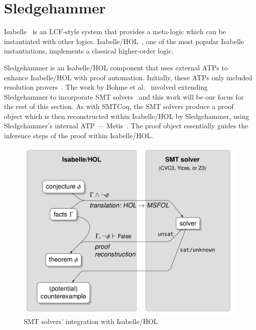 \documentclass[11pt]{article}
\begin{document}
	
	\section{Sledgehammer}
	\label{sec:hammer}
	Isabelle~\cite{DBLP:journals/corr/cs-LO-9301106} 
	is an LCF-style system that 
	provides a meta-logic which can be 
	instantiated with other logics.
	Isabelle/HOL~\cite{10.5555/1791547}, 
	one of the most popular Isabelle 
	instantiations, implements a 
	classical higher-order logic. 
	
	Sledgehammer is
	an Isabelle/HOL component that 
	uses external ATPs to enhance 
	Isabelle/HOL with proof 
	automation. Initially, these 
	ATPs only included resolution 
	provers~\cite{10.1007/978-3-642-39799-8_1}.
	The work by Bohme et 
	al.~\cite{bohme} involved 
	extending Sledgehammer to 
	incorporate SMT
	solvers~\cite{Barrett2018} and this 
	work will be our focus for the 
	rest of this section. As with 
	SMTCoq, the SMT solvers produce a 
	proof object which is 
	then reconstructed within
	Isabelle/HOL by Sledgehammer, 
	using Sledgehammer's internal 
	ATP --- Metis~\cite{hurd2003d}. The 
	proof object essentially guides 
	the inference steps of the proof 
	within Isabelle/HOL.
	
	\begin{figure}[t]
		\begin{center}
			\includegraphics[scale=0.3]{sledgehammer}
			\caption{SMT solvers' integration with 
			Isabelle/HOL}
			\label{fig:sledgehammer}
		\end{center}
	\end{figure}
\end{document}
